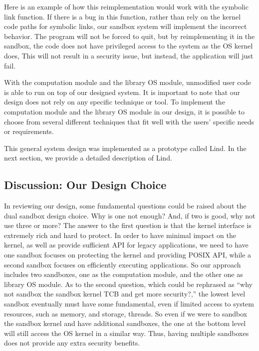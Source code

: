Here is an example of how this reimplementation would work with the symbolic link function.
If there is a bug in this function, rather than rely on the kernel code paths
for symbolic links, our sandbox system will implement the incorrect behavior.
The program will not be forced to quit, but by reimplementing it in the sandbox,
the code does not have privileged access to the system as the OS kernel does,
This will not result in a security issue, but instead, the application will just fail.

With the computation module and the library OS module, unmodified user code is able to run on top of our designed system.
It is important to note that our design does not rely on any specific technique or tool.
To implement the computation module and the library OS module in our design,
it is possible to choose from several different techniques that fit well with the users' specific needs or requirements.

This general system design was implemented as a prototype called Lind.
In the next section, we provide a detailed description of Lind.

\subsection{Discussion: Our Design Choice}

In reviewing our design, some fundamental questions could be raised about the dual sandbox design choice.
Why is one not enough? And, if two is good, why not use three or more?
The answer to the first question is that the kernel interface is extremely rich and hard to protect.
In order to have minimal impact on the kernel, as well as provide sufficient API for legacy applications,
we need to have one sandbox focuses on protecting the kernel and providing POSIX API,
while a second sandbox focuses on efficiently executing applications.
So our approach includes two sandboxes, one as the computation module,
and the other one as library OS module. As to the second question,
which could be rephrased as ``why not sandbox the sandbox kernel TCB and get more security?,''
the lowest level sandbox eventually must have some fundamental,
even if  limited access to system resources, such as memory, and storage, threads.
So even if we were to sandbox the sandbox kernel and have additional sandboxes,
the one at the bottom level will still access the OS kernel in a similar way.
Thus, having multiple sandboxes does not provide any extra security benefits.
